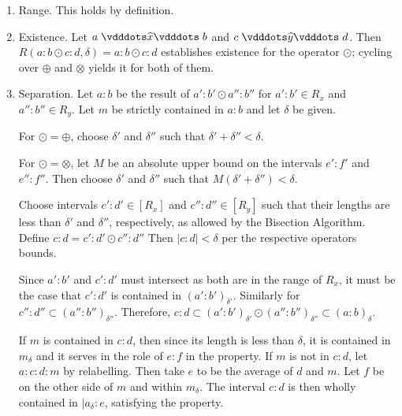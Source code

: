 \documentclass[12pt]{article}
\begin{document}
\begin{enumerate}
    \item Range. This holds by definition. 
    \item Existence. Let $a \xora b$ and $c \xora[y] d$. Then $R(a:b \odot c:d, \delta) = a:b \odot c:d$ establishes existence for the operator $\odot$; cycling over $\oplus$ and $\otimes$ yields it for both of them. 
    \item Separation. Let $a:b$ be the result of $a':b' \odot a'':b''$ for $a':b' \in R_x$ and $a'': b'' \in R_y$. Let $m$ be strictly contained in $a:b$ and let $\delta$ be given. 
    
    
    For $\odot = \oplus$, choose $\delta'$ and $\delta''$ such that $\delta' + \delta'' < \delta$. 
    
    For $\odot = \otimes$, let $M$ be an absolute upper bound on the intervals $e':f'$ and $e'':f''$. Then choose $\delta'$ and $\delta''$ such that $M (\delta' + \delta'') < \delta$.
    
    Choose intervals $c':d' \in [R_x]$ and $c'':d'' \in [R_y]$  such that their lengths are less than $\delta'$ and $\delta''$, respectively, as allowed by the Bisection Algorithm. Define $c:d = c':d' \odot c'':d''$ Then $|c:d| < \delta$ per the respective operators bounds. 
    
    Since $a':b'$ and $c':d'$ must intersect as both are in the range of $R_x$, it must be the case that $c':d'$ is contained in $(a':b')_{\delta'}$. Similarly for $c'':d'' \subset (a'':b'')_{\delta''}$. Therefore, $c:d \subset (a':b')_{\delta'} \odot (a'':b'')_{\delta''} \subset (a:b)_\delta$.

    If $m$ is contained in $c:d$, then since its length is less than $\delta$, it is contained in $m_\delta$ and it serves in the role of $e:f$ in the property. If $m$ is not in $c:d$, let $a:c:d:m$ by relabelling. Then take $e$ to be the average of $d$ and $m$. Let $f$ be on the other side of $m$ and within $m_\delta$. The interval $c:d$ is then wholly contained in $|a_\delta:e$, satisfying the property. 
    
    
    



\end{enumerate}
\end{document}

